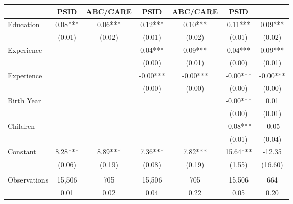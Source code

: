 \begin{tabular}{lcccccc} \toprule 
           & PSID & ABC/CARE & PSID & ABC/CARE & PSID \\ \midrule
Education & 0.08*** & 0.06*** & 0.12*** & 0.10*** & 0.11*** & 0.09*** \\
 & (0.01) & (0.02) & (0.01) & (0.02) & (0.01) & (0.02) \\
 Experience &  &  & 0.04*** & 0.09*** & 0.04*** & 0.09*** \\
 &  &  & (0.00) & (0.01) & (0.00) & (0.01) \\
Experience &  &  & -0.00*** & -0.00*** & -0.00*** & -0.00*** \\
 &  &  & (0.00) & (0.00) & (0.00) & (0.00) \\
 Birth Year &  &  &  &  & -0.00*** & 0.01 \\
 &  &  &  &  & (0.00) & (0.01) \\
 Children &  &  &  &  & -0.08*** & -0.05 \\
 &  &  &  &  & (0.01) & (0.04) \\
Constant & 8.28*** & 8.89*** & 7.36*** & 7.82*** & 15.64*** & -12.35 \\
 & (0.06) & (0.19) & (0.08) & (0.19) & (1.55) & (16.60) \\ \\ \midrule
Observations & 15,506 & 705 & 15,506 & 705 & 15,506 & 664 \\
 & 0.01 & 0.02 & 0.04 & 0.22 & 0.05 & 0.20 \\ \bottomrule
\end{tabular}
